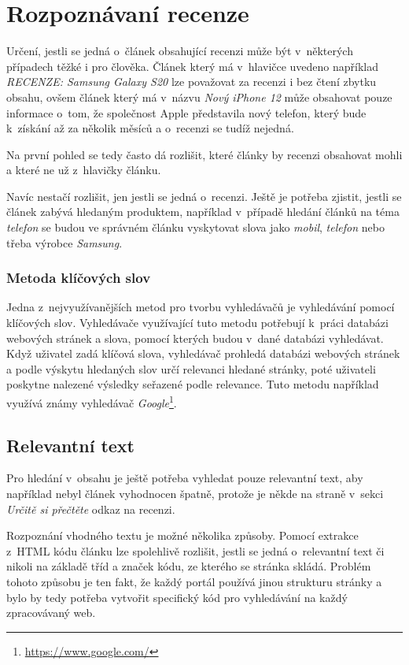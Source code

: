 \section{Rozpoznávaní recenze}

Určení, jestli se jedná o~článek obsahující recenzi může být v~některých případech těžké i pro člověka. Článek který má v~hlavičce uvedeno například \textit{RECENZE: Samsung Galaxy S20} lze považovat za recenzi i bez čtení zbytku obsahu, ovšem článek který má v~názvu \textit{Nový iPhone 12} může obsahovat pouze informace o~tom, že společnost Apple představila nový telefon, který bude k~získání až za několik měsíců a o~recenzi se tudíž nejedná.

Na první pohled se tedy často dá rozlišit, které články by recenzi obsahovat mohli a které ne už z~hlavičky článku.

Navíc nestačí rozlišit, jen jestli se jedná o~recenzi. Ještě je potřeba zjistit, jestli se článek zabývá hledaným produktem, například v~případě hledání článků na téma \textit{telefon} se budou ve správném článku vyskytovat slova jako \textit{mobil}, \textit{telefon} nebo třeba výrobce \textit{Samsung}\cite{kohlschutter2010boilerplate}\cite{gordon1999finding}.

\subsubsection*{Metoda klíčových slov}
Jedna z~nejvyužívanějších metod pro tvorbu vyhledávačů je vyhledávání pomocí klíčových slov. Vyhledávače využívající tuto metodu potřebují k~práci databázi webových stránek a slova, pomocí kterých budou v~dané databázi vyhledávat\cite{rasolofo2003term}. Když uživatel zadá klíčová slova, vyhledávač prohledá databázi webových stránek a podle výskytu hledaných slov určí relevanci hledané stránky, poté uživateli poskytne nalezené výsledky seřazené podle relevance. Tuto metodu například využívá známy vyhledávač \textit{Google}\footnote{\url{https://www.google.com/}}\cite{bast2016semantic}.

\subsection*{Relevantní text}
Pro hledání v~obsahu je ještě potřeba vyhledat pouze relevantní text, aby například nebyl článek vyhodnocen špatně, protože je někde na straně v~sekci \textit{Určitě si přečtěte} odkaz na recenzi.

Rozpoznání vhodného textu je možné několika způsoby. Pomocí extrakce z~HTML kódu článku lze spolehlivě rozlišit, jestli se jedná o~relevantní text či nikoli na základě tříd a značek kódu, ze kterého se stránka skládá. Problém tohoto způsobu je ten fakt, že každý portál používá jinou strukturu stránky a bylo by tedy potřeba vytvořit specifický kód pro vyhledávání na každý zpracovávaný web\cite{laender2002brief}. 
    
